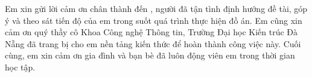 \begin{acknowledgments}

Em xin gửi lời cảm ơn chân thành đến \dauGVHD, người đã tận tình định hướng
đề tài, góp ý và theo sát tiến độ của em trong suốt quá trình thực hiện đồ
án. Em cũng xin cảm ơn quý thầy cô Khoa Công nghệ Thông tin, Trường Đại học
Kiến trúc Đà Nẵng đã trang bị cho em nền tảng kiến thức để hoàn thành công
việc này. Cuối cùng, em xin cảm ơn gia đình và bạn bè đã luôn động viên em
trong thời gian học tập.

\vspace{1.4em}
\hfill{}

\end{acknowledgments}

